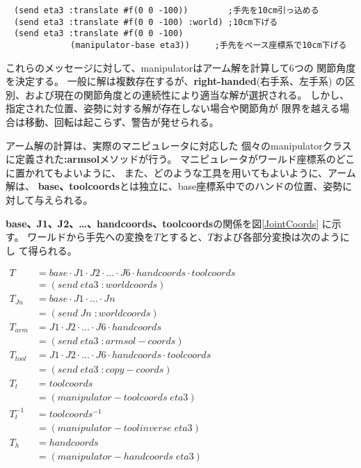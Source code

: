 \begin{verbatim}
　(send eta3 :translate #f(0 0 -100))        ;手先を10cm引っ込める　
　(send eta3 :translate #f(0 0 -100) :world) ;10cm下げる
　(send eta3 :translate #f(0 0 -100)
             (manipulator-base eta3))     ;手先をベース座標系で10cm下げる
\end{verbatim}

これらのメッセージに対して、manipulatorはアーム解を計算して6つの
関節角度を決定する。
一般に解は複数存在するが、{\bf right-handed}(右手系、左手系)
の区別、および現在の関節角度との連続性により適当な解が選択される。
しかし、指定された位置、姿勢に対する解が存在しない場合や関節角が
限界を越える場合は移動、回転は起こらず、警告が発せられる。

アーム解の計算は、実際のマニピュレータに対応した
個々のmanipulatorクラスに定義された{\bf :armsol}メソッドが行う。
マニピュレータがワールド座標系のどこに置かれてもよいように、
また、どのような工具を用いてもよいように、アーム解は、
{\bf base、toolcoords}とは独立に、base座標系中でのハンドの位置、姿勢に
対して与えられる。

{\bf base、J1、J2、\ldots 、handcoords、toolcoords}の関係を図\ref{JointCoords}
に示す。
ワールドから手先への変換を$T$とすると、$T$および各部分変換は次のようにし
て得られる。

$
\begin{array}{ll}
T & = base \cdot J1 \cdot J2 \cdot \ldots 
\cdot J6 \cdot handcoords \cdot toolcoords \\ 
 & = (send \; eta3 \; :worldcoords) \\ 
T_{Jn} & = base \cdot J1\cdot \ldots \cdot Jn \\
 & = (send \; Jn \; :worldcoords) \\
T_{arm} & = J1 \cdot J2 \cdot \ldots \cdot J6 \cdot handcoords \\ 
 & = (send \; eta3 \; :armsol-coords) \\ 
T_{tool} & = J1 \cdot J2 \cdot  \ldots \cdot J6 \cdot handcoords \cdot toolcoords \\ 
 & = (send \; eta3 \; :copy-coords) \\
T_{t} & = toolcoords \\ 
 & = (manipulator-toolcoords \; eta3)\\
T_{t}^{-1} & = toolcoords^{-1} \\ 
 & = (manipulator-toolinverse \; eta3) \\
T_{h} & = handcoords \\ 
 & = (manipulator-handcoords \; eta3)\\
\end{array}$


